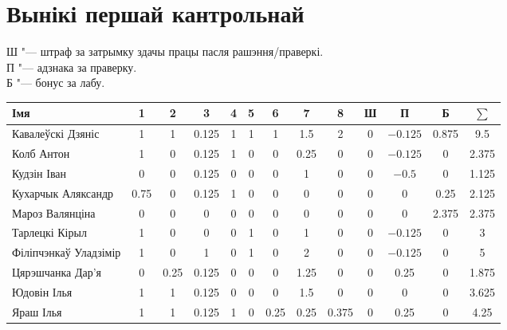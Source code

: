 \documentclass[12pt, a4paper]{extarticle}
\begin{document}
    \section{Вынікі першай кантрольнай}
    \noindent Ш "--- штраф за затрымку здачы працы пасля рашэння/праверкі. \\
    П "--- адзнака за праверку. \\
    Б "--- бонус за лабу.
    \begin{table}[H]
        \begin{tabular}{|l|c|c|c|c|c|c|c|c|c|c|c|c|}
            \hline
            Імя                   &  1   &  2   &   3   & 4 & 5 &  6   &  7   &   8   & Ш &    П     &   Б   & $\sum$ \\ \hline
            Кавалеўскі Дзяніс     &  1   &  1   & 0.125 & 1 & 1 &  1   &  1.5 &   2   & 0 & $-0.125$ & 0.875 &   9.5  \\ \hline
            Колб Антон            &  1   &  0   & 0.125 & 1 & 0 &  0   & 0.25 &   0   & 0 & $-0.125$ &   0   &  2.375 \\ \hline
            Кудзін Іван           &  0   &  0   & 0.125 & 0 & 0 &  0   &  1   &   0   & 0 &  $-0.5$  &   0   &  1.125 \\ \hline
            Кухарчык Аляксандр    & 0.75 &  0   & 0.125 & 1 & 0 &  0   &  0   &   0   & 0 &    0     &  0.25 &  2.125 \\ \hline
            Мароз Валянціна       &  0   &  0   &   0   & 0 & 0 &  0   &  0   &   0   & 0 &    0     & 2.375 &  2.375 \\ \hline
            Тарлецкі Кірыл        &  1   &  0   &   0   & 0 & 1 &  0   &  1   &   0   & 0 & $-0.125$ &   0   &   3    \\ \hline
            Філіпчэнкаў Уладзімір &  1   &  0   &   1   & 0 & 1 &  0   &  2   &   0   & 0 & $-0.125$ &   0   &   5    \\ \hline
            Цярэшчанка Дар'я      &  0   & 0.25 & 0.125 & 0 & 0 &  0   & 1.25 &   0   & 0 &   0.25   &   0   &  1.875 \\ \hline
            Юдовін Ілья           &  1   &  1   & 0.125 & 0 & 0 &  0   &  1.5 &   0   & 0 &    0     &   0   &  3.625 \\ \hline
            Яраш Ілья             &  1   &  1   & 0.125 & 1 & 0 & 0.25 & 0.25 & 0.375 & 0 &   0.25   &   0   &  4.25  \\ \hline
        \end{tabular}
    \end{table}
\end{document}
